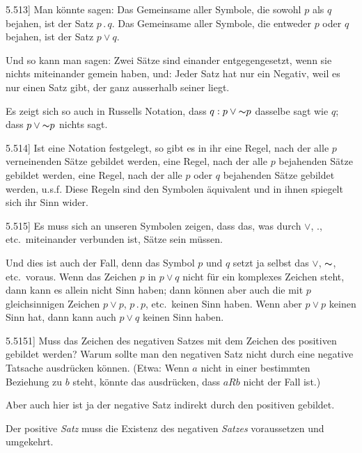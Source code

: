 \documentclass[12pt,oneside]{book}[2007/10/19]
\newcommand{\PropERef}[1]{\hyperref[PropE:#1]{#1}}
\newcommand{\PropositionG}[2]{%
  \item[\phantomsection\label{PropG:#1}\PropERef{#1}] #2%
}
\newcommand{\DPtypo}[2]{#2}
\newcommand{\Not}[1]{\mathord{\thicksim} #1}
\newcommand{\DotOp}{\mathbin{.}}
\newcommand{\Emph}[1]{\emph{#1}}%
\newcommand{\undSoFort}{u.\;s.\;f.}
\begin{document}
\begin{propositions}
\PropositionG{5.513}
{Man könnte sagen: Das Gemeinsame aller Symbole,
die sowohl $p$ als $q$ bejahen, ist der Satz
\glqq{}$p \DotOp q$\grqq{}. Das Gemeinsame aller Symbole, die
entweder $p$ oder $q$ bejahen, ist der Satz \glqq{}$p \lor q$\grqq{}.

Und so kann man sagen: Zwei Sätze sind
einander entgegengesetzt, wenn sie nichts miteinander
gemein haben, und: Jeder Satz hat nur ein
Negativ, weil es nur einen Satz gibt, der ganz
ausserhalb seiner liegt.

Es zeigt sich so auch in Russells Notation, dass
\glqq{}$q : p \lor \Not{p}$\grqq{} dasselbe sagt wie \glqq{}$q$\grqq{}; dass \glqq{}$p \lor \Not{p}$\grqq{}
\DPtypo{nichtssagt}{nichts sagt}.}


\PropositionG{5.514}
{Ist eine Notation festgelegt, so gibt es in ihr eine
Regel, nach der alle $p$ verneinenden \DPtypo{Sätz}{Sätze} gebildet
werden, eine Regel, nach der alle $p$ bejahenden
Sätze gebildet werden, eine Regel, nach der alle
$p$ oder $q$ bejahenden Sätze gebildet werden, \undSoFort{}
Diese Regeln sind den Symbolen äquivalent
und in ihnen spiegelt sich ihr Sinn \DPtypo{wieder}{wider}.}


\PropositionG{5.515}
{Es muss sich an unseren Symbolen zeigen, dass
das, was durch \glqq{}$\lor$\grqq{}, \glqq{}$\DotOp$\grqq{}, etc.\ miteinander verbunden
ist, Sätze sein müssen.

Und dies ist auch der Fall, denn das Symbol \glqq{}$p$\grqq{}
und \glqq{}$q$\grqq{} setzt ja selbst das \glqq{}$\lor$\grqq{}, \glqq{}$\Not{}$\grqq{}, etc.\ voraus.
Wenn das Zeichen \glqq{}$p$\grqq{} in \glqq{}$p \lor q$\grqq{} nicht für ein komplexes
Zeichen steht, dann kann es allein nicht
Sinn haben; dann können aber auch die mit \glqq{}$p$\grqq{}
gleichsinnigen Zeichen \glqq{}$p \lor p$\grqq{}, \glqq{}$p \DotOp p$\grqq{}, etc.\ keinen
Sinn haben. Wenn aber \glqq{}$p \lor p$\grqq{} keinen Sinn hat,
dann kann auch \glqq{}$p \lor q$\grqq{} keinen Sinn haben.}


\PropositionG{5.5151}
{Muss das Zeichen des negativen Satzes mit dem
Zeichen des positiven gebildet werden? Warum
sollte man den negativen Satz nicht durch eine negative
Tatsache ausdrücken können. (Etwa: Wenn
\glqq{}$a$\grqq{} nicht in einer bestimmten Beziehung zu \glqq{}$b$\grqq{} steht,
könnte das ausdrücken, dass $aRb$ nicht der Fall ist.)

Aber auch hier ist ja der negative Satz indirekt
durch den positiven gebildet.

Der positive \Emph{Satz} muss die Existenz des negativen
\Emph{Satzes} voraussetzen und umgekehrt.}



\end{propositions}
\end{document}

